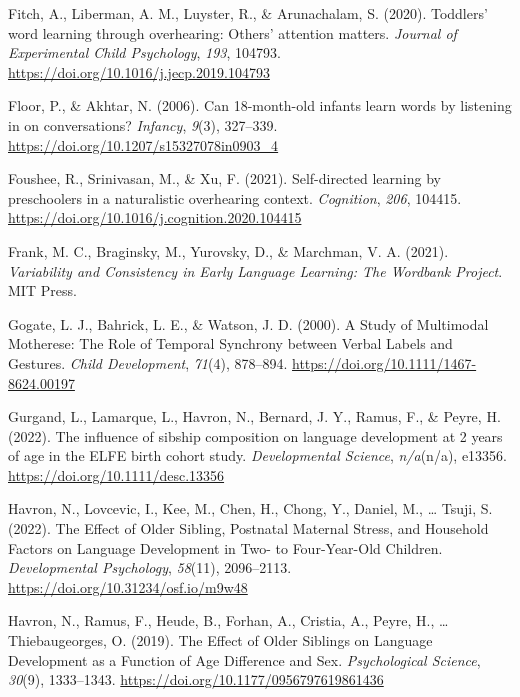 \documentclass[
  man,mask,floatsintext]{apa6}
\newlength{\cslhangindent}
\newlength{\cslentryspacingunit} %
\newenvironment{CSLReferences}[2] %
 {%
  \setlength{\parindent}{0pt}
  \ifodd #1
  \let\oldpar\par
  \def\par{\hangindent=\cslhangindent\oldpar}
  \fi
  \setlength{\parskip}{#2\cslentryspacingunit}
 }%
 {}
\begin{document}
\begin{CSLReferences}{1}{0}
\leavevmode{}%
Fitch, A., Liberman, A. M., Luyster, R., \& Arunachalam, S. (2020). Toddlers' word learning through overhearing: {Others}' attention matters. \emph{Journal of Experimental Child Psychology}, \emph{193}, 104793. \url{https://doi.org/10.1016/j.jecp.2019.104793}

\leavevmode{}%
Floor, P., \& Akhtar, N. (2006). Can 18-month-old infants learn words by listening in on conversations? \emph{Infancy}, \emph{9}(3), 327--339. \url{https://doi.org/10.1207/s15327078in0903_4}

\leavevmode{}%
Foushee, R., Srinivasan, M., \& Xu, F. (2021). Self-directed learning by preschoolers in a naturalistic overhearing context. \emph{Cognition}, \emph{206}, 104415. \url{https://doi.org/10.1016/j.cognition.2020.104415}

\leavevmode{}%
Frank, M. C., Braginsky, M., Yurovsky, D., \& Marchman, V. A. (2021). \emph{Variability and {Consistency} in {Early} {Language} {Learning}: {The} {Wordbank} {Project}}. MIT Press.

\leavevmode{}%
Gogate, L. J., Bahrick, L. E., \& Watson, J. D. (2000). A {Study} of {Multimodal} {Motherese}: {The} {Role} of {Temporal} {Synchrony} between {Verbal} {Labels} and {Gestures}. \emph{Child Development}, \emph{71}(4), 878--894. \url{https://doi.org/10.1111/1467-8624.00197}

\leavevmode{}%
Gurgand, L., Lamarque, L., Havron, N., Bernard, J. Y., Ramus, F., \& Peyre, H. (2022). The influence of sibship composition on language development at 2 years of age in the {ELFE} birth cohort study. \emph{Developmental Science}, \emph{n/a}(n/a), e13356. \url{https://doi.org/10.1111/desc.13356}

\leavevmode{}%
Havron, N., Lovcevic, I., Kee, M., Chen, H., Chong, Y., Daniel, M., \ldots{} Tsuji, S. (2022). The {Effect} of {Older} {Sibling}, {Postnatal} {Maternal} {Stress}, and {Household} {Factors} on {Language} {Development} in {Two}- to {Four}-{Year}-{Old} {Children}. \emph{Developmental Psychology}, \emph{58}(11), 2096--2113. \url{https://doi.org/10.31234/osf.io/m9w48}

\leavevmode{}%
Havron, N., Ramus, F., Heude, B., Forhan, A., Cristia, A., Peyre, H., \ldots{} Thiebaugeorges, O. (2019). The {Effect} of {Older} {Siblings} on {Language} {Development} as a {Function} of {Age} {Difference} and {Sex}. \emph{Psychological Science}, \emph{30}(9), 1333--1343. \url{https://doi.org/10.1177/0956797619861436}


\end{CSLReferences}
\end{document}
